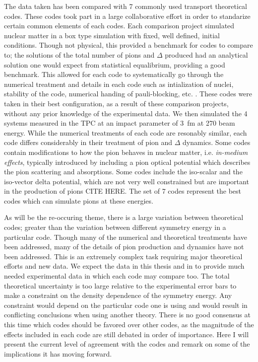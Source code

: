 The data taken has been compared with 7 commonly used transport theoretical codes. These codes took part in a large collaborative effort in order to standarize certain common elements of each codes. Each comparison project simulated nuclear matter in a box type simulation with fixed, well defined, initial conditions. Though not physical, this provided a benchmark for codes to compare to; the solutions of the total number of pions and $\Delta$ produced had an analytical solution one would expect from statistical equalibrium, providing a good benchmark. This allowed for each code to systematically go through the numerical treatment and details in each code such as intialization of nuclei, stability of the code, numerical handing of pauli-blocking, etc. \cite{theoryComp1,theoryComp2}. These codes were taken in their best configuration, as a result of these comparison projects, without any prior knowledge of the experimental data. We then simulated the 4 systems measured in the \spirit TPC at an impact parameter of \SI{3}{\femto\metre} at \SI{270}{\MeVA} beam energy. While the numerical treatments of each code are resonably similar, each code differs considerably in their treatment of pion and $\Delta$ dynamics. Some codes contain modifications to how the pion behaves in nuclear matter, i.e. \emph{in-medium effects}, typically introduced by including a pion optical potential which describes the pion scattering and absorptions. Some codes include the iso-scalar and the iso-vector delta potential, which are not very well constrained but are important in the production of pions CITE HERE. The set of 7 codes represent the best codes which can simulate pions at these energies. 

As will be the re-occuring theme, there is a large variation between theoretical codes; greater than the variation between different symmetry energy in a particular code. Though many of the numerical and theoretical treatments have been addressed, many of the details of pion production and dynamics have not been addressed. This is an extremely complex task requiring major theoretical efforts and new data. We expect the data in this thesis and in \cite{jon} to provide much needed experimental data in which each code may compare too. The total theoretical uncertainty is too large relative to the experimental error bars to make a constraint on the density dependence of the symmetry energy. Any constraint would depend on the particular code one is using and would result in conflicting conclusions when using another theory. There is no good consensus at this time which codes should be favored over other codes, as the magnitude of the effects included in each code are still debated in order of importance. Here I will present the current level of agreement with the codes and remark on some of the implications it has moving forward. 


